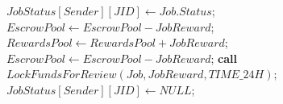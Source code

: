 \documentclass{article}
\begin{document}
\begin{algorithm}
\begin{algorithmic}[1]
    \vspace{1mm}
        \vspace{1mm}
        \State $JobStatus[Sender][JID] \gets Job.Status$;\vspace{1mm}
        \EndIf\vspace{1mm}
    \EndWhile\vspace{1mm}
    \vspace{1mm}
        \State $EscrowPool \gets EscrowPool - JobReward$;\vspace{1mm}
        \State $RewardsPool \gets RewardsPool + JobReward$;\vspace{1mm}        
    \Else\vspace{1mm}
        \State $EscrowPool \gets EscrowPool - JobReward$;\vspace{1mm}
        \State \textbf{call} $LockFundsForReview(Job, JobReward, TIME\_24H);$ \vspace{1mm}
    \EndIf\vspace{1mm}
    \State $JobStatus[Sender][JID] \gets NULL$;\vspace{1mm}
\end{algorithmic}
\end{algorithm}
\end{document}

